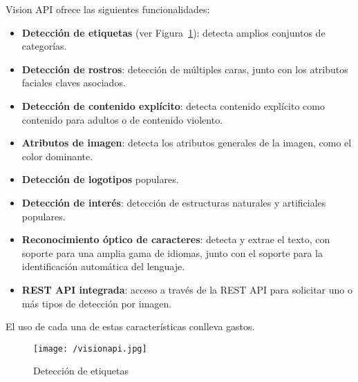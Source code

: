 Vision API ofrece las siguientes funcionalidades:
\begin{itemize}
\item \textbf{Detección de etiquetas} (ver Figura~\ref{fig:visionapi2}): detecta amplios conjuntos de categorías.
\item \textbf{Detección de rostros}: detección de múltiples caras, junto con los atributos faciales claves asociados.
\item \textbf{Detección de contenido explícito}: detecta contenido explícito como contenido para adultos o de contenido violento.
\item \textbf{Atributos de imagen}: detecta los atributos generales de la imagen, como el color dominante.
\item \textbf{Detección de logotipos} populares.
\item \textbf{Detección de interés}: detección de estructuras naturales y artificiales populares.
\item \textbf{Reconocimiento óptico de caracteres}: detecta y extrae el texto, con soporte para una amplia gama de idiomas, junto con el soporte para la identificación automática del lenguaje.
\item \textbf{REST API integrada}: acceso a través de la REST API para solicitar uno o más tipos de detección por imagen.
\end{itemize}

El uso de cada una de estas características conlleva gastos.

\begin{figure}[!h]
\begin{center}
\texttt{[image: /visionapi.jpg]}
\caption[Detección de etiquetas]{Detección de etiquetas}
\label{fig:visionapi2}
\end{center}
\end{figure}


